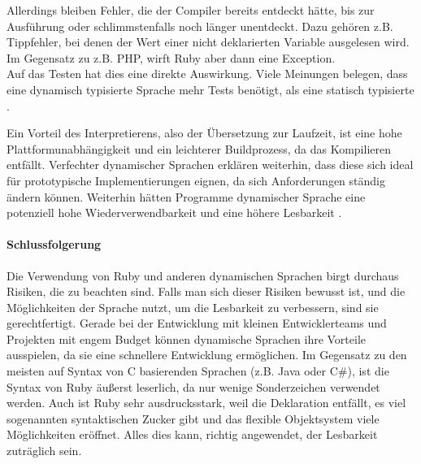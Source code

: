 Allerdings bleiben Fehler, die der Compiler bereits entdeckt hätte, bis zur Ausführung oder schlimmstenfalls noch länger unentdeckt. Dazu gehören z.B. Tippfehler, bei denen der Wert einer nicht deklarierten Variable ausgelesen wird. Im Gegensatz zu z.B. PHP, wirft Ruby aber dann eine Exception.\\
Auf das Testen hat dies eine direkte Auswirkung. Viele Meinungen belegen, dass eine dynamisch typisierte Sprache mehr Tests benötigt, als eine statisch typisierte \citep{daniel_spiewak_dynamic_2010}. 


Ein Vorteil des Interpretierens, also der Übersetzung zur Laufzeit, ist eine hohe Plattformunabhängigkeit und ein leichterer Buildprozess, da das Kompilieren entfällt. 
Verfechter dynamischer Sprachen erklären weiterhin, dass diese sich ideal für prototypische Implementierungen eignen, da sich Anforderungen ständig ändern können. Weiterhin hätten Programme dynamischer Sprache eine potenziell hohe Wiederverwendbarkeit und eine höhere Lesbarkeit \citep{meijer_static_2005} \citep{ousterhout_scripting:_1998}.


% 
% 
% 





\paragraph{Schlussfolgerung}
Die Verwendung von Ruby und anderen dynamischen Sprachen birgt durchaus Risiken, die zu beachten sind. Falls man sich dieser Risiken bewusst ist, und die Möglichkeiten der Sprache nutzt, um die Lesbarkeit zu verbessern, sind sie gerechtfertigt. Gerade bei der Entwicklung mit kleinen Entwicklerteams und Projekten mit engem Budget können dynamische Sprachen ihre Vorteile ausspielen, da sie eine schnellere Entwicklung ermöglichen. Im Gegensatz zu den meisten auf Syntax von C basierenden Sprachen (z.B. Java oder C\#), ist die Syntax von Ruby äußerst leserlich, da nur wenige Sonderzeichen verwendet werden. Auch ist Ruby sehr ausdrucksstark, weil die Deklaration entfällt, es viel sogenannten syntaktischen Zucker gibt und das flexible Objektsystem viele Möglichkeiten eröffnet. Alles dies kann, richtig angewendet, der Lesbarkeit zuträglich sein.


